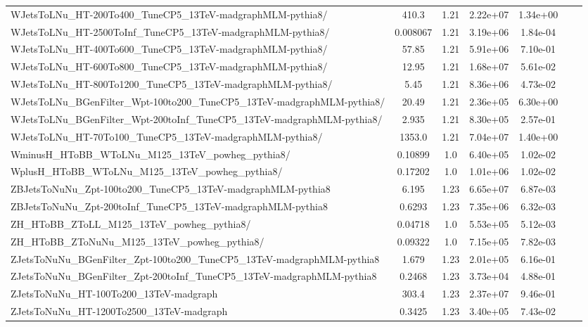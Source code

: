 \begin{table}
\begin{center}
{\begin{tabular}{|l|c|c|c|c|c|c|}
WJetsToLNu\_HT-200To400\_TuneCP5\_13TeV-madgraphMLM-pythia8/ & 410.3 & 1.21 & 2.22e+07 & {\color{orange}1.34e+00} \\
WJetsToLNu\_HT-2500ToInf\_TuneCP5\_13TeV-madgraphMLM-pythia8/ & 0.008067 & 1.21 & 3.19e+06 & 1.84e-04 \\
WJetsToLNu\_HT-400To600\_TuneCP5\_13TeV-madgraphMLM-pythia8/ & 57.85 & 1.21 & 5.91e+06 & {\color{orange}7.10e-01} \\
WJetsToLNu\_HT-600To800\_TuneCP5\_13TeV-madgraphMLM-pythia8/ & 12.95 & 1.21 & 1.68e+07 & 5.61e-02 \\
WJetsToLNu\_HT-800To1200\_TuneCP5\_13TeV-madgraphMLM-pythia8/ & 5.45 & 1.21 & 8.36e+06 & 4.73e-02 \\
WJetsToLNu\_BGenFilter\_Wpt-100to200\_TuneCP5\_13TeV-madgraphMLM-pythia8/ & 20.49 & 1.21 & 2.36e+05 & {\color{red}6.30e+00} \\
WJetsToLNu\_BGenFilter\_Wpt-200toInf\_TuneCP5\_13TeV-madgraphMLM-pythia8/ & 2.935 & 1.21 & 8.30e+05 & 2.57e-01 \\
WJetsToLNu\_HT-70To100\_TuneCP5\_13TeV-madgraphMLM-pythia8/ & 1353.0 & 1.21 & 7.04e+07 & {\color{orange}1.40e+00} \\
WminusH\_HToBB\_WToLNu\_M125\_13TeV\_powheg\_pythia8/ & 0.10899 & 1.0 & 6.40e+05 & 1.02e-02 \\
WplusH\_HToBB\_WToLNu\_M125\_13TeV\_powheg\_pythia8/ & 0.17202 & 1.0 & 1.01e+06 & 1.02e-02 \\
ZBJetsToNuNu\_Zpt-100to200\_TuneCP5\_13TeV-madgraphMLM-pythia8 & 6.195 & 1.23 & 6.65e+07 & 6.87e-03 \\
ZBJetsToNuNu\_Zpt-200toInf\_TuneCP5\_13TeV-madgraphMLM-pythia8 & 0.6293 & 1.23 & 7.35e+06 & 6.32e-03 \\
ZH\_HToBB\_ZToLL\_M125\_13TeV\_powheg\_pythia8/ & 0.04718 & 1.0 & 5.53e+05 & 5.12e-03 \\
ZH\_HToBB\_ZToNuNu\_M125\_13TeV\_powheg\_pythia8/ & 0.09322 & 1.0 & 7.15e+05 & 7.82e-03 \\
ZJetsToNuNu\_BGenFilter\_Zpt-100to200\_TuneCP5\_13TeV-madgraphMLM-pythia8 & 1.679 & 1.23 & 2.01e+05 & {\color{orange}6.16e-01} \\
ZJetsToNuNu\_BGenFilter\_Zpt-200toInf\_TuneCP5\_13TeV-madgraphMLM-pythia8 & 0.2468 & 1.23 & 3.73e+04 & {\color{orange}4.88e-01} \\
ZJetsToNuNu\_HT-100To200\_13TeV-madgraph & 303.4 & 1.23 & 2.37e+07 & {\color{orange}9.46e-01} \\
ZJetsToNuNu\_HT-1200To2500\_13TeV-madgraph & 0.3425 & 1.23 & 3.40e+05 & 7.43e-02 \\

\end{tabular}}
\end{center}
\end{table}
